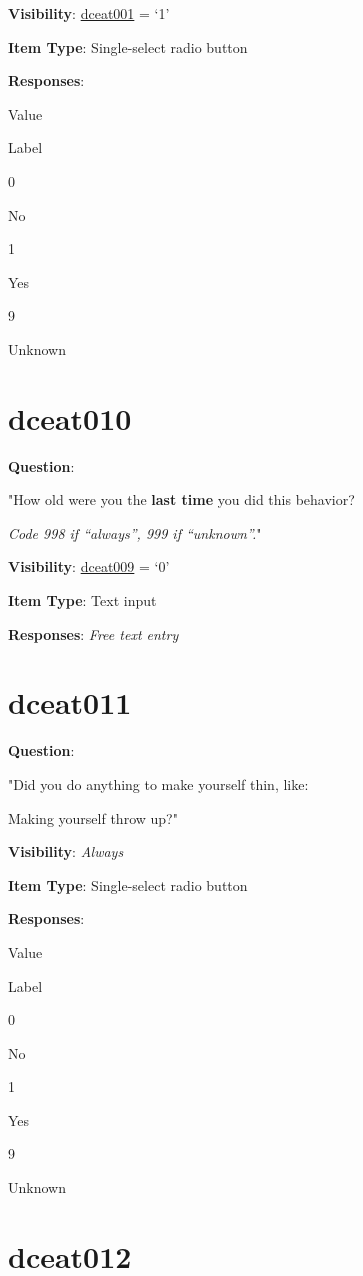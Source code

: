 \documentclass[]{book}
\begin{document}
\textbf{Visibility}: \protect\hyperlink{dceat001}{dceat001} = `1'

\textbf{Item Type}: Single-select radio button

\textbf{Responses}:

Value

Label

0

No

1

Yes

9

Unknown

\hypertarget{dceat010}{%
\section{dceat010}\label{dceat010}}

\textbf{Question}:

"How old were you the \textbf{last time} you did this behavior?

\emph{Code 998 if ``always'', 999 if ``unknown''.}"

\textbf{Visibility}: \protect\hyperlink{dceat009}{dceat009} = `0'

\textbf{Item Type}: Text input

\textbf{Responses}: \emph{Free text entry}

\hypertarget{dceat011}{%
\section{dceat011}\label{dceat011}}

\textbf{Question}:

"Did you do anything to make yourself thin, like:

Making yourself throw up?"

\textbf{Visibility}: \emph{Always}

\textbf{Item Type}: Single-select radio button

\textbf{Responses}:

Value

Label

0

No

1

Yes

9

Unknown

\hypertarget{dceat012}{%
\section{dceat012}\label{dceat012}}
\end{document}
